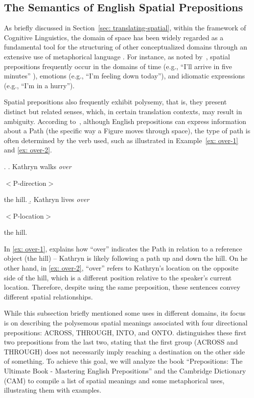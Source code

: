 {{\subsection{The Semantics of English Spatial Prepositions}
\label{sec: Spatial Prepositions}

As briefly discussed in Section~\ref{sec: translating-spatial}, within the framework of Cognitive Linguistics, the domain of space has been widely regarded as a fundamental tool for the structuring of other conceptualized domains through an extensive use of metaphorical language \parencite{LakoffJohnson80}. For instance, as noted by~\textcite{coventry:04b}, spatial prepositions frequently occur in the domains of time (e.g., ``I'll arrive in five minutes''%
), emotions (e.g., ``I'm feeling down today''), and idiomatic expressions (e.g., ``I'm in a hurry''). 

Spatial prepositions also frequently exhibit polysemy, that is, they present distinct but related senses, which, in certain translation contexts, may result in ambiguity. According to~\textcite{coventry:04b}, although English prepositions can express information about a Path (the specific way a Figure moves through space), the type of path is often determined by the verb used, such as illustrated in Example~\ref{ex: over-1} and \ref{ex: over-2}. 

\ex. 
    \a. Kathryn walks \textit{over}\begin{scriptsize}$<$P-direction$>$\end{scriptsize}\label{ex: over-1} the hill. 
    \b. Kathryn lives \textit{over}\begin{scriptsize}$<$P-location$>$\end{scriptsize}\label{ex: over-2} the hill.

In \ref{ex: over-1}, \textcite{coventry:04b} explains how ``over'' indicates the Path in relation to a reference object (the hill) -- Kathryn is likely following a path up and down the hill. On he other hand, in \ref{ex: over-2}, ``over'' refers to Kathryn's location on the opposite side of the hill, which is a different position relative to the speaker's current location. Therefore, despite using the same preposition, these sentences convey different spatial relationships.

While this subsection briefly mentioned some uses in different domains, its focus is on describing the polysemous spatial meanings associated with four directional prepositions: ACROSS, THROUGH, INTO, and ONTO. \textcite{bruckfield2011prepositions} distinguishes these first two prepositions from the last two, stating that the first group (ACROSS and THROUGH) does not necessarily imply reaching a destination on the other side of something. To achieve this goal, we will analyze the book ``Prepositions: The Ultimate Book - Mastering English Prepositions''\parencite{bruckfield2011prepositions} and the Cambridge  Dictionary (CAM) to compile a list of spatial meanings and some metaphorical uses, illustrating them with examples.


}}
